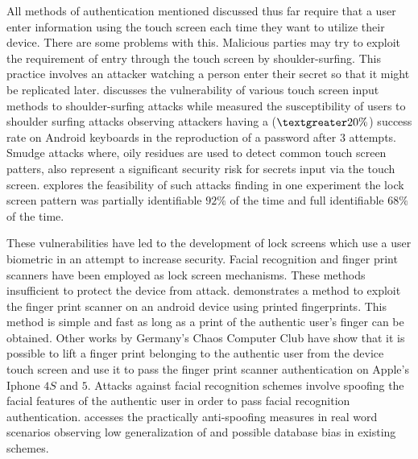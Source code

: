 All methods of authentication mentioned discussed thus far
require that a user enter information using the touch screen
each time they want to utilize their device.
%
There are some problems with this.
Malicious parties may try to 
exploit the requirement of entry through the
touch screen by
shoulder-surfing.
This practice involves an attacker
watching a person enter their secret 
so that it might be replicated later.
%
\cite{schaub2012password} discusses the vulnerability of
various touch screen input methods to shoulder-surfing attacks
while
\cite{hafiz2008towards} measured the susceptibility of 
users to shoulder surfing attacks observing
attackers having a ($\textgreater20\%$) success rate
on Android keyboards
in the reproduction of a password after $3$ attempts.
%
Smudge attacks where,
oily residues are used to detect common touch screen patters,
also represent a significant security risk
for secrets input via the touch screen.
\cite{aviv2010smudge} explores the feasibility of
such attacks finding in one experiment
the lock screen pattern was partially identifiable $92\%$ of the time
and full identifiable $68\%$ of the time.

These vulnerabilities have led to the development of 
lock screens which 
use a user biometric in an attempt to increase security.
Facial recognition and finger print scanners have
been employed as lock screen mechanisms.
These methods insufficient to protect the device from attack.
%
\cite{cao2016hacking} demonstrates a method 
to exploit the finger print scanner on an android device
using printed fingerprints.
This method is simple and fast as long as a print of the
authentic user's finger can be obtained.
%
Other works by Germany's Chaos Computer Club \cite{CHAOS}
have show that it is possible to lift a finger print 
belonging to the authentic user from the device touch screen
and use it to pass the finger print scanner authentication on Apple's Iphone $4S$ and $5$. 
%
Attacks against facial recognition schemes involve
spoofing the facial features of the authentic user
in order to pass facial recognition authentication.
\cite{de2013can}
accesses the practically anti-spoofing measures in real word scenarios
observing 
low generalization of
and possible database bias in existing schemes.

